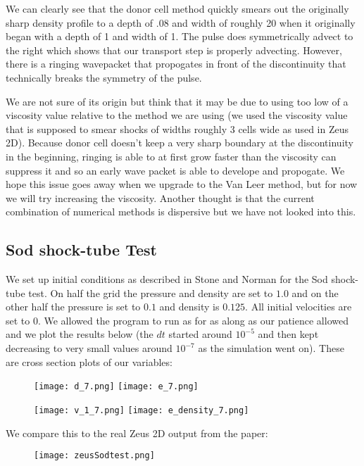 \documentclass[11pt]{article}
\begin{document}
We can clearly see that the donor cell method quickly smears out the originally sharp density profile to a depth of .08 and width of roughly 20 when it originally began with a depth of 1 and width of 1. The pulse does symmetrically advect to the right which shows that our transport step is properly advecting. However, there is a ringing wavepacket that propogates in front of the discontinuity that technically breaks the symmetry of the pulse. 
    
    We are not sure of its origin but think that it may be due to using too low of a viscosity value relative to the method we are using (we used the viscosity value that is supposed to smear shocks of widths roughly 3 cells wide as used in Zeus 2D). Because donor cell doesn't keep a very sharp boundary at the discontinuity in the beginning, ringing is able to at first grow faster than the viscosity can suppress it and so an early wave packet is able to develope and propogate. We hope this issue goes away when we upgrade to the Van Leer method, but for now we will try increasing the viscosity. Another thought is that the current combination of numerical methods is dispersive but we have not looked into this.
\subsection{Sod shock-tube Test}
We set up initial conditions as described in Stone and Norman for the Sod shock-tube test. On half the grid the pressure and density are set to $1.0$ and on the other half the pressure is set to $0.1$ and density is $0.125$. All initial velocities are set to $0$. We allowed the program to run as for as along as our patience allowed and we plot the results below (the $dt$ started around $10^{-5}$ and then kept decreasing to very small values around $10^{-7}$ as the simulation went on). These are cross section plots of our variables:

\clearpage
\begin{figure}[h!]
  \texttt{[image: d\_7.png]}
    \texttt{[image: e\_7.png]}

\end{figure}
\begin{figure}[h]
  \texttt{[image: v\_1\_7.png]}
    \texttt{[image: e\_density\_7.png]}
\end{figure}
\clearpage
We compare this to the real Zeus 2D output from the paper:
 
\begin{figure}[h]
  \texttt{[image: zeusSodtest.png]}
\end{figure}
\clearpage
\end{document}
